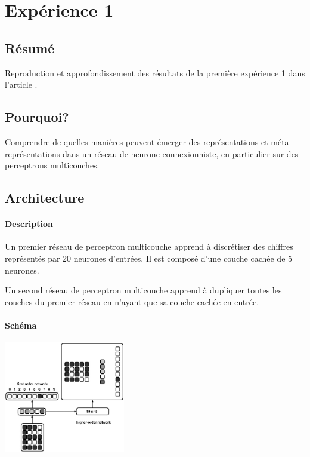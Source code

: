 \documentclass[a4paper,12pt]{article}
\begin{document}
  \section*{Expérience 1}
    \subsection*{Résumé}
      Reproduction et approfondissement des résultats de la première expérience 1 dans l'article 
      \cite{Cleeremans_2007}. 

    
    \subsection*{Pourquoi?}
      Comprendre de quelles manières peuvent émerger des représentations et méta-représentations dans 
      un réseau de neurone connexionniste, en particulier sur des perceptrons multicouches.
    
    
    \subsection*{Architecture}
      \paragraph*{Description}
	Un premier réseau de perceptron multicouche apprend à discrétiser des chiffres représentés
	par 20 neurones d'entrées. Il est composé d'une couche cachée de 5 neurones.
	
	Un second réseau de perceptron multicouche apprend à dupliquer toutes les couches du premier
	réseau en n'ayant que sa couche cachée en entrée.

      \paragraph*{Schéma}
	\begin{center}
	  \includegraphics[width=200px]{../cleeremans_2007/digit_reco/digit_reco.png}
	\end{center}
	
\end{document}

